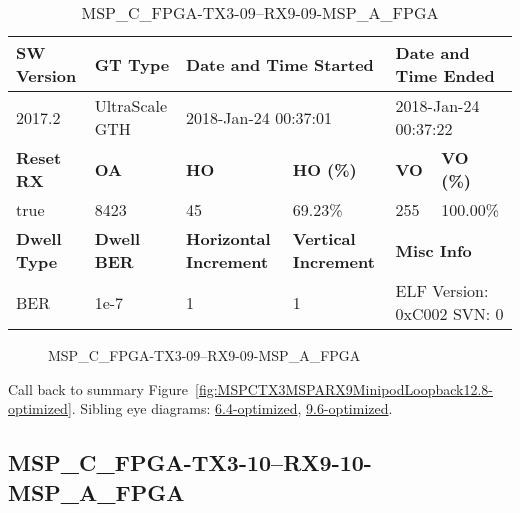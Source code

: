 \begin{table}[h]
\centering
\caption{MSP\_C\_FPGA-TX3-09--RX9-09-MSP\_A\_FPGA}
\label{tab:MSPCFPGATX309RX909MSPAFPGA12.8-optimized}
\begin{tabular}{@{}|l|l|l|l|l|l|@{}}
\toprule
\textbf{SW Version}                & \textbf{GT Type}   & \multicolumn{2}{l|}{\textbf{Date and Time Started}}            & \multicolumn{2}{l|}{\textbf{Date and Time Ended}}        \\ \midrule
2017.2                       & UltraScale GTH          & \multicolumn{2}{l|}{2018-Jan-24 00:37:01}                   & \multicolumn{2}{l|}{2018-Jan-24 00:37:22}               \\ \midrule
\textbf{Reset RX}                  & \textbf{OA} & \textbf{HO}   & \textbf{HO (\%)} & \textbf{VO} & \textbf{VO (\%)} \\ \midrule
true & 8423        & 45          & 69.23\%        & 255        & 100.00\%       \\ \midrule
\textbf{Dwell Type}                & \textbf{Dwell BER} & \textbf{Horizontal Increment} & \textbf{Vertical Increment}    & \multicolumn{2}{l|}{\textbf{Misc Info}}                  \\ \midrule
BER                            & 1e-7        & 1        & 1           & \multicolumn{2}{l|}{ELF Version: 0xC002 SVN: 0}                         \\ \bottomrule
\end{tabular}
\end{table}

\begin{figure}[h]
\caption{MSP\_C\_FPGA-TX3-09--RX9-09-MSP\_A\_FPGA} \label{fig:MSPCFPGATX309RX909MSPAFPGA12.8-optimized}
\end{figure}

Call back to summary Figure~\ref{fig:MSPCTX3MSPARX9MinipodLoopback12.8-optimized}.
Sibling eye diagrams: \hyperref[sec:MSPCFPGATX309RX909MSPAFPGA6.4-optimized]{6.4-optimized}, \hyperref[sec:MSPCFPGATX309RX909MSPAFPGA9.6-optimized]{9.6-optimized}.

\clearpage
\newpage


\subsection{MSP\_C\_FPGA-TX3-10--RX9-10-MSP\_A\_FPGA}\label{sec:MSPCFPGATX310RX910MSPAFPGA12.8-optimized}

